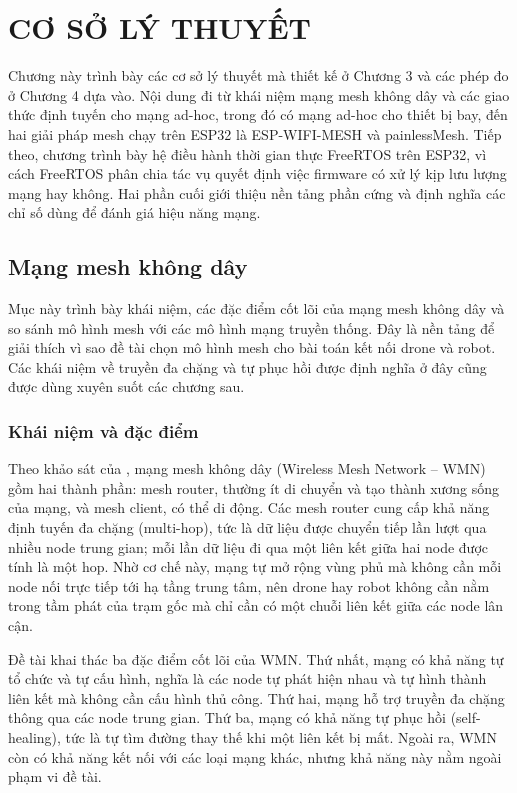 \chapter{CƠ SỞ LÝ THUYẾT}\label{chap:2}

Chương này trình bày các cơ sở lý thuyết mà thiết kế ở Chương 3 và các phép đo ở Chương 4 dựa vào. Nội dung đi từ khái niệm mạng mesh không dây và các giao thức định tuyến cho mạng ad-hoc, trong đó có mạng ad-hoc cho thiết bị bay, đến hai giải pháp mesh chạy trên ESP32 là ESP-WIFI-MESH và painlessMesh. Tiếp theo, chương trình bày hệ điều hành thời gian thực FreeRTOS trên ESP32, vì cách FreeRTOS phân chia tác vụ quyết định việc firmware có xử lý kịp lưu lượng mạng hay không. Hai phần cuối giới thiệu nền tảng phần cứng và định nghĩa các chỉ số dùng để đánh giá hiệu năng mạng.


\section{Mạng mesh không dây}\label{sec:2.1}

Mục này trình bày khái niệm, các đặc điểm cốt lõi của mạng mesh không dây và so sánh mô hình mesh với các mô hình mạng truyền thống. Đây là nền tảng để giải thích vì sao đề tài chọn mô hình mesh cho bài toán kết nối drone và robot. Các khái niệm về truyền đa chặng và tự phục hồi được định nghĩa ở đây cũng được dùng xuyên suốt các chương sau.


\subsection{Khái niệm và đặc điểm}

Theo khảo sát của \citet{akyildiz2005}, mạng mesh không dây (Wireless Mesh Network – WMN) gồm hai thành phần: mesh router, thường ít di chuyển và tạo thành xương sống của mạng, và mesh client, có thể di động. Các mesh router cung cấp khả năng định tuyến đa chặng (multi-hop), tức là dữ liệu được chuyển tiếp lần lượt qua nhiều node trung gian; mỗi lần dữ liệu đi qua một liên kết giữa hai node được tính là một hop. Nhờ cơ chế này, mạng tự mở rộng vùng phủ mà không cần mỗi node nối trực tiếp tới hạ tầng trung tâm, nên drone hay robot không cần nằm trong tầm phát của trạm gốc mà chỉ cần có một chuỗi liên kết giữa các node lân cận.

Đề tài khai thác ba đặc điểm cốt lõi của WMN. Thứ nhất, mạng có khả năng tự tổ chức và tự cấu hình, nghĩa là các node tự phát hiện nhau và tự hình thành liên kết mà không cần cấu hình thủ công. Thứ hai, mạng hỗ trợ truyền đa chặng thông qua các node trung gian. Thứ ba, mạng có khả năng tự phục hồi (self-healing), tức là tự tìm đường thay thế khi một liên kết bị mất. Ngoài ra, WMN còn có khả năng kết nối với các loại mạng khác, nhưng khả năng này nằm ngoài phạm vi đề tài.


